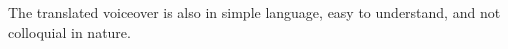 \documentclass[preview]{standalone}
\begin{document}
\begin{flushleft}
\fontsize{15}{0}\selectfont The translated voiceover is also in simple language, easy to understand, and not colloquial in nature.
\end{flushleft}
\end{document}
